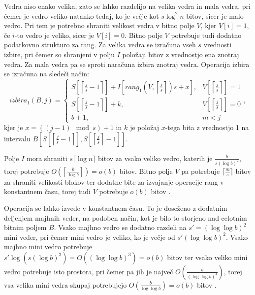 Vedra niso enako velika, zato se lahko razdelijo na velika vedra in mala vedra, pri čemer je vedro veliko natanko tedaj, ko je večje kot $s\log^2 n$ bitov, sicer je malo vedro. Pri tem je potrebno shraniti velikost vedra v bitno polje $V$, kjer $V[i]=1$, če $i$-to vedro je veliko, sicer je $V[i]=0$. Bitno polje $V$ potrebuje tudi dodatno podatkovno strukturo za rang. Za velika vedra se izračuna vseh $s$ vrednosti izbire, pri čemer so shranjeni v polju $I$ položaji bitov z vrednostjo ena znotraj vedra. Za mala vedra pa se sproti naračuna izbira znotraj vedra. Operacija izbira se izračuna na sledeči način:
\begin{equation*}
    izbira_1(B,j)=\left\{
    \begin{array}{rl}
       S\left[\left\lceil \frac{j}{s} -1\right\rceil\right] + I\left[rang_1(V,\left\lceil \frac{j}{s} \right\rceil)s+x\right], & V\left[\left\lceil \frac{j}{s} \right\rceil\right] = 1\\ 
       S\left[\left\lceil \frac{j}{s} -1 \right\rceil\right] + k, & V\left[\left\lceil \frac{j}{s} \right\rceil\right] = 0\\
       b+1, & m < j
    \end{array}\right.,
\end{equation*}
kjer je $x = ((j-1) \mod{s})+1$ in $k$ je položaj $x$-tega bita z vrednostjo 1 na intervalu $B\left[ S\left[\left\lceil \frac{j}{s} -1 \right\rceil\right], S\left[\left\lceil \frac{j}{s} \right\rceil-1\right]\right]$.

Polje $I$ mora shraniti $s\lceil\log n\rceil$ bitov za vsako veliko vedro, katerih je $\frac{b}{s(\log b)^2}$, torej potrebuje $O\left(\left\lceil\frac{b}{\log b}\right\rceil\right)=o(b)$ bitov. Bitno polje $V$ pa potrebuje $\lceil \frac{m}{s} \rceil$ bitov za shraniti velikosti blokov ter dodatne bite za izvajanje operacije rang v konstantnem času, torej tudi $V$ potrebuje $o(b)$ bitov \cite{Navarro2016}.

Operacija se lahko izvede v konstantnem času. To je doseženo z dodatnim deljenjem majhnih veder, na podoben način, kot je bilo to storjeno nad celotnim bitnim poljem $B$. Vsako majhno vedro se dodatno razdeli na $s'=(\log\log b)^2$ mini veder, pri čemer mini vedro je veliko, ko je večje od $s'(\log\log b)^2$. Vsako majhno mini vedro potrebuje $s'\log{(s(\log{b})^2)}=O((\log\log b)^3)=o(b)$ bitov ter vsako veliko mini vedro potrebuje isto prostora, pri čemer pa jih je največ $O\left(\frac{b}{(\log\log b)^4}\right)$, torej vsa velika mini vedra skupaj potrebujejo $O\left(\frac{b}{\log\log b}\right) =o(b)$ bitov \cite{Navarro2016}.


